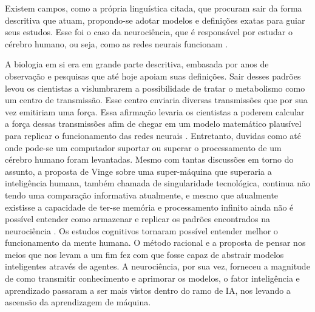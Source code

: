 Existem campos, como a própria linguística citada, que procuram sair da forma descritiva que atuam, propondo-se adotar modelos e definições exatas para guiar seus estudos. Esse foi o caso da neurociência, que é responsável por estudar o cérebro humano, ou seja, como as redes neurais funcionam \cite[10]{russell2003artificial}.

A biologia em si era em grande parte descritiva, embasada por anos de observação e pesquisas que até hoje apoiam suas definições. Sair desses padrões levou os cientistas a vislumbrarem a possibilidade de tratar o metabolismo como um centro de transmissão. Esse centro enviaria diversas transmissões que por sua vez emitiriam uma força. Essa afirmação levaria os cientistas a poderem calcular a força dessas transmissões afim de chegar em um modelo matemático plausível para replicar o funcionamento das redes neurais \cite[1-3]{rashevsky1960mathematical}. Entretanto, duvidas como até onde pode-se um computador suportar ou superar o processamento de um cérebro humano foram levantadas. Mesmo com tantas discussões em torno do assunto, a proposta de Vinge sobre uma super-máquina que superaria a inteligência humana, também chamada de singularidade tecnológica, continua não tendo uma comparação informativa atualmente, e mesmo que atualmente existisse a capacidade de ter-se memória e processamento infinito ainda não é possível entender como armazenar e replicar os padrões encontrados na neurociência \cite[11-12]{vinge1993coming,russell2003artificial}. Os estudos cognitivos tornaram possível entender melhor o funcionamento da mente humana. O método racional e a proposta de pensar nos meios que nos levam a um fim fez com que fosse capaz de abstrair modelos inteligentes através de agentes. A neurociência, por sua vez, forneceu a magnitude de como transmitir conhecimento e aprimorar os modelos, o fator inteligência e aprendizado passaram a ser mais vistos dentro do ramo de IA, nos levando a ascensão da aprendizagem de máquina.

